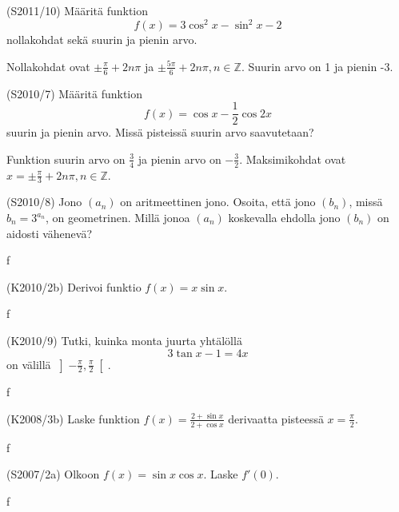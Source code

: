 \begin{tehtava} (S2011/10)
	Määritä funktion \[f(x)=3\cos^2x-\sin^2x-2\] nollakohdat sekä suurin ja pienin arvo.
		\begin{vastaus}
			Nollakohdat ovat $\pm\frac{\pi}{6}+2n\pi$ ja $\pm\frac{5\pi}{6}+2n\pi, 
			n\in\mathbb{Z}$. Suurin arvo on 1 ja pienin -3.
		\end{vastaus}
\end{tehtava}

\begin{tehtava} (S2010/7)
	Määritä funktion \[f(x)=\cos x-\frac{1}{2}\cos 2x\] suurin ja pienin arvo. Missä pisteissä suurin 
	arvo saavutetaan?
		\begin{vastaus}
			Funktion suurin arvo on $\frac{3}{4}$ ja pienin arvo on $-\frac{3}{2}$.
			Maksimikohdat ovat $x=\pm\frac{\pi}{3}+2n\pi, n\in\mathbb{Z}$. 
		\end{vastaus}
\end{tehtava}

\begin{tehtava} (S2010/8)
	Jono $(a_n)$ on aritmeettinen jono. Osoita, että jono $(b_n)$, missä $b_n=3^{a_n}$, on geometrinen. 
	Millä jonoa $(a_n)$ koskevalla ehdolla jono $(b_n)$ on aidosti vähenevä?
		\begin{vastaus}
			f
		\end{vastaus}
\end{tehtava}

\begin{tehtava} (K2010/2b)
	Derivoi funktio $f(x)=x\sin x$.
		\begin{vastaus}
			f
		\end{vastaus}
\end{tehtava}

\begin{tehtava} (K2010/9)
	Tutki, kuinka monta juurta yhtälöllä \[3\tan x-1=4x\] on välillä 
	$\left]-\frac{\pi}{2},\frac{\pi}{2}\right[$.
		\begin{vastaus}
			f
		\end{vastaus}
\end{tehtava}

\begin{tehtava} (K2008/3b)
	Laske funktion $f(x)=\frac{2+\sin x}{2+\cos x}$ derivaatta pisteessä $x=\frac{\pi}{2}$.
		\begin{vastaus}
			f
		\end{vastaus}
\end{tehtava}

\begin{tehtava} (S2007/2a)
	Olkoon $f(x)=\sin x\cos x$. Laske $f'(0)$.
		\begin{vastaus}
			f
		\end{vastaus}
\end{tehtava}

